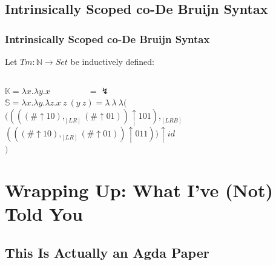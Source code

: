 \documentclass[aspectratio=169]{beamer}
\theoremstyle{remarkstyle}
\begin{document}
\subsection{Intrinsically Scoped co-De Bruijn Syntax}
\begin{frame}[fragile]
  \frametitle{Intrinsically Scoped co-De Bruijn Syntax}
  \begin{definition}
    Let $Tm : ℕ → Set$ be inductively defined: \\
    \begin{columns}
      \begin{column}{0.2\textwidth}
        \begin{center}
        \end{center}
      \end{column}
      \begin{column}{0.3\textwidth}
        \begin{center}
        \end{center}
      \end{column}
      \begin{column}{0.25\textwidth}
        \begin{center}
        \end{center}
      \end{column}
    \end{columns}
  \end{definition}
  \begin{example}
    $𝕂 = λx. λy. x \quad \quad \quad \quad \ \ = \lightning$\\
    $𝕊 = λx. λy. λz. x \ z \ (y \ z) = λ \ λ \ λ($\\
    \quad \quad $((((\# ↑ 10) ,_{[LR]} (\# ↑ 01)) ↑ 101) ,_{[LRB]} $\\
    \quad \quad $(((\# ↑ 10) ,_{[LR]} (\# ↑ 01)) ↑ 011)) ↑ id$\\
    $)$
  \end{example}
\end{frame}

\section{Wrapping Up: What I've (Not) Told You}
\subsection{This Is Actually an Agda Paper}
\end{document}
